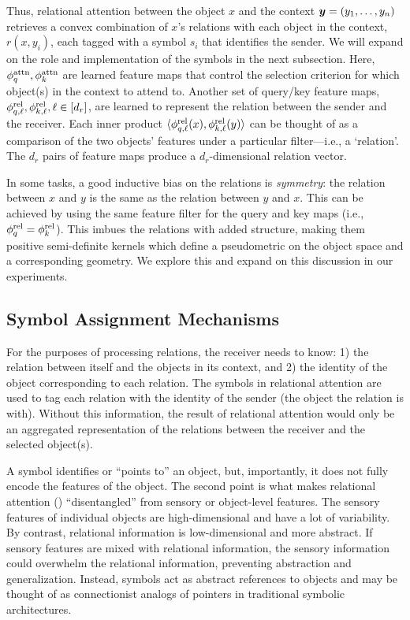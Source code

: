 Thus, relational attention between the object $x$ and the context $\bm{y} = (y_1, \ldots, y_n)$ retrieves a convex combination of $x$'s relations with each object in the context, $r(x, y_i)$, each tagged with a symbol $s_i$ that identifies the sender. We will expand on the role and implementation of the symbols in the next subsection. Here, $\phi_q^{\mathrm{attn}}, \phi_k^{\mathrm{attn}}$ are learned feature maps that control the selection criterion for which object(s) in the context to attend to. Another set of query/key feature maps, $\phi_{q, \ell}^{\mathrm{rel}}, \phi_{k, \ell}^{\mathrm{rel}}, \ell \in [d_r]$, are learned to represent the relation between the sender and the receiver. Each inner product $\langle \phi_{q, \ell}^{\mathrm{rel}}(x), \phi_{k, \ell}^{\mathrm{rel}}(y) \rangle$ can be thought of as a comparison of the two objects' features under a particular filter---i.e., a `relation'. The $d_r$ pairs of feature maps produce a $d_r$-dimensional relation vector.

In some tasks, a good inductive bias on the relations is \textit{symmetry}: the relation between $x$ and $y$ is the same as the relation between $y$ and $x$. This can be achieved by using the same feature filter for the query and key maps (i.e., $\phi_q^{\mathrm{rel}} = \phi_k^{\mathrm{rel}}$). This imbues the relations with added structure, making them positive semi-definite kernels which define a pseudometric on the object space and a corresponding geometry. We explore this and expand on this discussion in our experiments.

\subsection{Symbol Assignment Mechanisms}

For the purposes of processing relations, the receiver needs to know: 1) the relation between itself and the objects in its context, and 2) the identity of the object corresponding to each relation.
The symbols in relational attention are used to tag each relation with the identity of the sender (the object the relation is with). Without this information, the result of relational attention would only be an aggregated representation of the relations between the receiver and the selected object(s).

A symbol identifies or ``points to'' an object, but, importantly, it does not fully encode the features of the object. The second point is what makes relational attention () ``disentangled'' from sensory or object-level features. The sensory features of individual objects are high-dimensional and have a lot of variability. By contrast, relational information is low-dimensional and more abstract. If sensory features are mixed with relational information, the sensory information could overwhelm the relational information, preventing abstraction and generalization. Instead, symbols act as abstract references to objects and may be thought of as connectionist analogs of pointers in traditional symbolic architectures.

